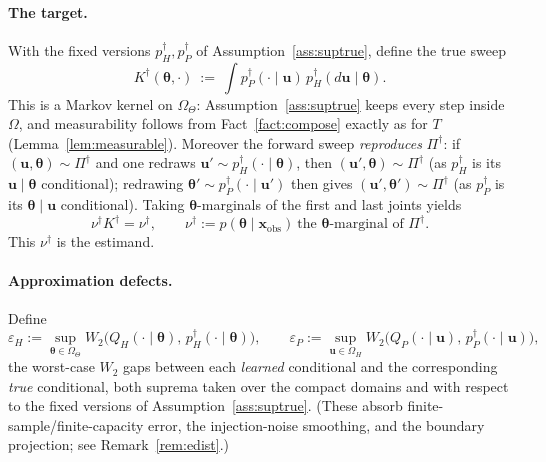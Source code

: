 \documentclass[11pt]{article}
\theoremstyle{definitionbreak}
\theoremstyle{plainbreak}
\theoremstyle{remarkbreak}
\newcommand{\Om}{\Omega}
\newcommand{\xobs}{\bm{x}_{\mathrm{obs}}}
\newcommand{\bth}{\bm{\theta}}
\begin{document}
\paragraph{The target.}
With the fixed versions $p^\dagger_H,p^\dagger_P$ of Assumption~\ref{ass:suptrue}, define the true
sweep
\[
  K^\dagger(\bth,\cdot)\ :=\ \int p^\dagger_P(\cdot\mid\bm u)\,p^\dagger_H(d\bm u\mid\bth).
\]
This is a Markov kernel on $\Om_\Theta$: Assumption~\ref{ass:suptrue} keeps every step inside $\Om$,
and measurability follows from Fact~\ref{fact:compose} exactly as for $T$ (Lemma~\ref{lem:measurable}).
Moreover the forward sweep \emph{reproduces} $\Pi^\dagger$: if $(\bm u,\bth)\sim\Pi^\dagger$ and one
redraws $\bm u'\sim p^\dagger_H(\cdot\mid\bth)$, then $(\bm u',\bth)\sim\Pi^\dagger$ (as $p^\dagger_H$
is its $\bm u\mid\bth$ conditional); redrawing $\bth'\sim p^\dagger_P(\cdot\mid\bm u')$ then gives
$(\bm u',\bth')\sim\Pi^\dagger$ (as $p^\dagger_P$ is its $\bth\mid\bm u$ conditional). Taking
$\bth$-marginals of the first and last joints yields
\[
  \nu^\dagger K^\dagger=\nu^\dagger,\qquad \nu^\dagger:=p(\bth\mid\xobs)\ \text{the $\bth$-marginal of }\Pi^\dagger .
\]
This $\nu^\dagger$ is the estimand.

\paragraph{Approximation defects.}
Define
\[
  \varepsilon_H:=\sup_{\bth\in\Om_\Theta} W_2\big(Q_H(\cdot\mid\bth),\,p^\dagger_H(\cdot\mid\bth)\big),\qquad
  \varepsilon_P:=\sup_{\bm u\in\Om_H} W_2\big(Q_P(\cdot\mid\bm u),\,p^\dagger_P(\cdot\mid\bm u)\big),
\]
the worst-case $W_2$ gaps between each \emph{learned} conditional and the corresponding \emph{true}
conditional, both suprema taken over the compact domains and with respect to the fixed versions of
Assumption~\ref{ass:suptrue}. (These absorb finite-sample/finite-capacity error, the injection-noise
smoothing, and the boundary projection; see Remark~\ref{rem:edist}.)
\end{document}
